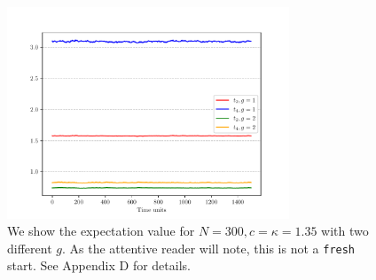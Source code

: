\documentclass[11pt]{article}
\begin{document}
\begin{figure}[htbp] 
	\centering 
	\includegraphics[width=0.75\textwidth]{figs/4MM_g1_g2.pdf}
	\caption{\label{fig:4MM_closed1} We show the expectation value for $N=300, c=\kappa=1.35$ with two different $g$. As the attentive reader will note, this is not a \texttt{fresh} start. See Appendix D for details. }
\end{figure}


\end{document}
